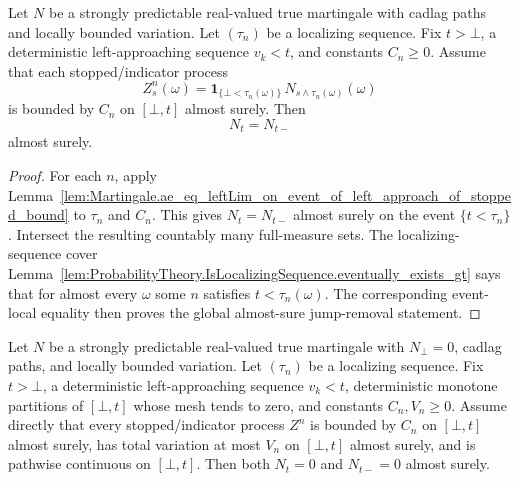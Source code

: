\begin{lemma}\label{lem:Martingale.ae_eq_leftLim_localizingSequence_of_left_approach_of_stopped_bound}
Let \(N\) be a strongly predictable real-valued true martingale with cadlag
paths and locally bounded variation.  Let \((\tau_n)\) be a localizing
sequence.  Fix \(t>\bot\), a deterministic left-approaching sequence
\(v_k<t\), and constants \(C_n\ge0\).  Assume that each stopped/indicator
process
\[
  Z^n_s(\omega)=
  \mathbf 1_{\{\bot<\tau_n(\omega)\}}\,
  N_{s\wedge\tau_n(\omega)}(\omega)
\]
is bounded by \(C_n\) on \([\bot,t]\) almost surely.  Then
\[
  N_t=N_{t-}
\]
almost surely.
\end{lemma}

\begin{proof}
For each \(n\), apply
Lemma~\ref{lem:Martingale.ae_eq_leftLim_on_event_of_left_approach_of_stopped_bound}
to \(\tau_n\) and \(C_n\).  This gives \(N_t=N_{t-}\) almost surely on the
event \(\{t<\tau_n\}\).  Intersect the resulting countably many full-measure
sets.  The localizing-sequence cover
Lemma~\ref{lem:ProbabilityTheory.IsLocalizingSequence.eventually_exists_gt}
says that for almost every \(\omega\) some \(n\) satisfies
\(t<\tau_n(\omega)\).  The corresponding event-local equality then proves the
global almost-sure jump-removal statement.
\end{proof}

\begin{lemma}\label{lem:Martingale.eq_zero_and_leftLim_eq_zero_of_localizingSequence_bounded_continuous_finiteVariation_of_variation_bound_continuousOn}
Let \(N\) be a strongly predictable real-valued true martingale with
\(N_\bot=0\), cadlag paths, and locally bounded variation.  Let
\((\tau_n)\) be a localizing sequence.  Fix \(t>\bot\), a deterministic
left-approaching sequence \(v_k<t\), deterministic monotone partitions of
\([\bot,t]\) whose mesh tends to zero, and constants \(C_n,V_n\ge0\).
Assume directly that every stopped/indicator process \(Z^n\) is bounded by
\(C_n\) on \([\bot,t]\) almost surely, has total variation at most \(V_n\)
on \([\bot,t]\) almost surely, and is pathwise continuous on \([\bot,t]\).
Then both \(N_t=0\) and \(N_{t-}=0\) almost surely.
\end{lemma}

